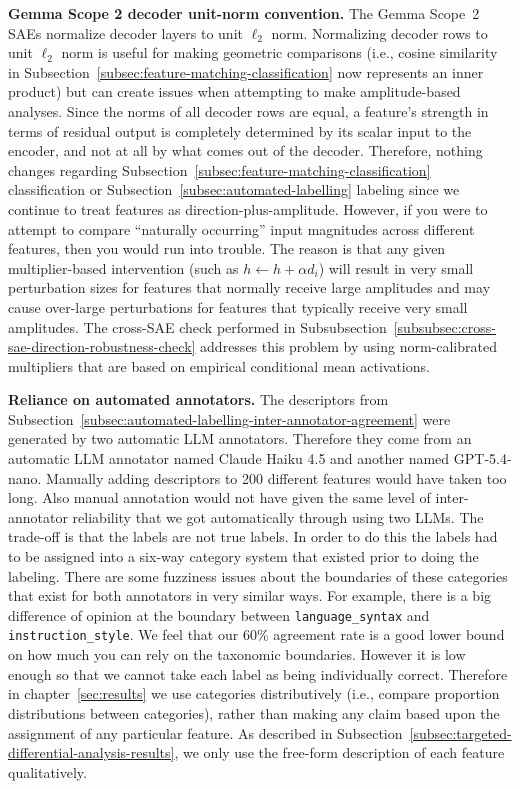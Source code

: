 \textbf{Gemma Scope 2 decoder unit-norm convention.} The Gemma Scope~2 SAEs \parencite{mcdougall_gemma_scope_2_2025} normalize decoder layers to unit $\ell_2$ norm. Normalizing decoder rows to unit $\ell_2$ norm is useful for making geometric comparisons (i.e., cosine similarity in Subsection~\ref{subsec:feature-matching-classification} now represents an inner product) but can create issues when attempting to make amplitude-based analyses. Since the norms of all decoder rows are equal, a feature's strength in terms of residual output is completely determined by its scalar input to the encoder, and not at all by what comes out of the decoder. Therefore, nothing changes regarding Subsection~\ref{subsec:feature-matching-classification} classification or Subsection~\ref{subsec:automated-labelling} labeling since we continue to treat features as direction-plus-amplitude. However, if you were to attempt to compare ``naturally occurring'' input magnitudes across different features, then you would run into trouble. The reason is that any given multiplier-based intervention (such as $h \leftarrow h + \alpha d_i$) will result in very small perturbation sizes for features that normally receive large amplitudes and may cause over-large perturbations for features that typically receive very small amplitudes. The cross-SAE check performed in Subsubsection~\ref{subsubsec:cross-sae-direction-robustness-check} addresses this problem by using norm-calibrated multipliers that are based on empirical conditional mean activations.

\textbf{Reliance on automated annotators.} The descriptors from Subsection~\ref{subsec:automated-labelling-inter-annotator-agreement} were generated by two automatic LLM annotators. Therefore they come from an automatic LLM annotator named Claude Haiku 4.5 and another named GPT-5.4-nano. Manually adding descriptors to 200 different features would have taken too long. Also manual annotation would not have given the same level of inter-annotator reliability that we got automatically through using two LLMs. The trade-off is that the labels are not true labels. In order to do this the labels had to be assigned into a six-way category system that existed prior to doing the labeling. There are some fuzziness issues about the boundaries of these categories that exist for both annotators in very similar ways. For example, there is a big difference of opinion at the boundary between \texttt{language\_syntax} and \texttt{instruction\_style}. We feel that our 60\% agreement rate is a good lower bound on how much you can rely on the taxonomic boundaries. However it is low enough so that we cannot take each label as being individually correct. Therefore in chapter~\ref{sec:results} we use categories distributively (i.e., compare proportion distributions between categories), rather than making any claim based upon the assignment of any particular feature. As described in Subsection~\ref{subsec:targeted-differential-analysis-results}, we only use the free-form description of each feature qualitatively.

